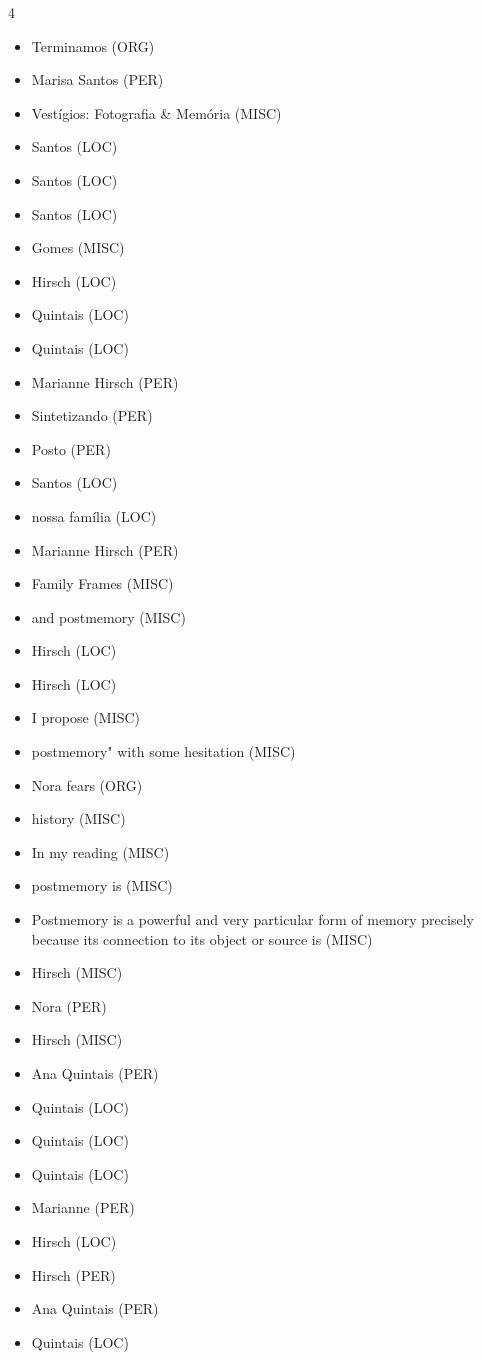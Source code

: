 \documentclass{article}
\begin{document}
\begin{multicols}{4}
\begin{itemize}
\item Terminamos (ORG)
\item Marisa Santos (PER)
\item Vestígios:  Fotografia  \&  Memória (MISC)
\item Santos (LOC)
\item Santos (LOC)
\item Santos (LOC)
\item Gomes (MISC)
\item Hirsch (LOC)
\item Quintais (LOC)
\item Quintais (LOC)
\item Marianne  Hirsch (PER)
\item Sintetizando (PER)
\item Posto (PER)
\item Santos (LOC)
\item nossa  família (LOC)
\item Marianne Hirsch (PER)
\item Family 
Frames (MISC)
\item and  postmemory (MISC)
\item Hirsch (LOC)
\item Hirsch (LOC)
\item I propose (MISC)
\item postmemory" with some hesitation (MISC)
\item Nora fears (ORG)
\item history (MISC)
\item In  my  reading (MISC)
\item postmemory  is (MISC)
\item Postmemory is a 
powerful  and  very  particular  form  of  memory  precisely  because  its  connection  to  its 
object  or  source  is   (MISC)
\item Hirsch (MISC)
\item Nora (PER)
\item Hirsch (MISC)
\item Ana  Quintais (PER)
\item Quintais (LOC)
\item Quintais (LOC)
\item Quintais (LOC)
\item Marianne (PER)
\item Hirsch (LOC)
\item Hirsch (PER)
\item Ana Quintais (PER)
\item Quintais (LOC)

\end{itemize}
\end{multicols}
\end{document}
